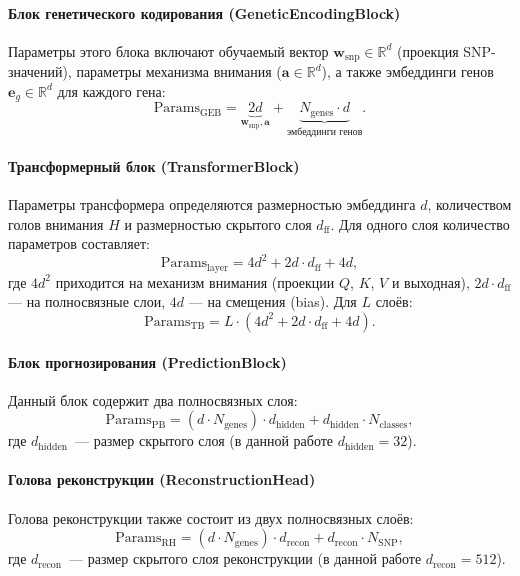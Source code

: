 \paragraph{Блок генетического кодирования (GeneticEncodingBlock)}

Параметры этого блока включают обучаемый вектор $\mathbf{w}_{\text{snp}} \in \mathbb{R}^d$ 
(проекция SNP-значений), параметры механизма внимания ($\mathbf{a} \in \mathbb{R}^d$), 
а также эмбеддинги генов $\mathbf{e}_g \in \mathbb{R}^d$ для каждого гена:
\[
\text{Params}_{\text{GEB}} = \underbrace{2d}_{\mathbf{w}_{\text{snp}}, \mathbf{a}} + \underbrace{N_{\text{genes}} \cdot d}_{\text{эмбеддинги генов}}.
\]

\paragraph{Трансформерный блок (TransformerBlock)}

Параметры трансформера определяются размерностью эмбеддинга $d$, количеством 
голов внимания $H$ и размерностью скрытого слоя $d_{\text{ff}}$. Для одного 
слоя количество параметров составляет:
\[
\text{Params}_{\text{layer}} = 4d^2 + 2d \cdot d_{\text{ff}} + 4d,
\]
где $4d^2$ приходится на механизм внимания (проекции $Q$, $K$, $V$ и выходная),
$2d \cdot d_{\text{ff}}$ --- на полносвязные слои, $4d$ --- на смещения (bias).
Для $L$ слоёв:
\[
\text{Params}_{\text{TB}} = L \cdot \left(4d^2 + 2d \cdot d_{\text{ff}} + 4d\right).
\]

\paragraph{Блок прогнозирования (PredictionBlock)}

Данный блок содержит два полносвязных слоя:
\[
\text{Params}_{\text{PB}} = (d \cdot N_{\text{genes}}) \cdot d_{\text{hidden}} + d_{\text{hidden}} \cdot N_{\text{classes}},
\]
где $d_{\text{hidden}}$~--- размер скрытого слоя (в данной работе $d_{\text{hidden}} = 32$).

\paragraph{Голова реконструкции (ReconstructionHead)}

Голова реконструкции также состоит из двух полносвязных слоёв:
\[
\text{Params}_{\text{RH}} = (d \cdot N_{\text{genes}}) \cdot d_{\text{recon}} + d_{\text{recon}} \cdot N_{\text{SNP}},
\]
где $d_{\text{recon}}$~--- размер скрытого слоя реконструкции (в данной работе $d_{\text{recon}} = 512$).

